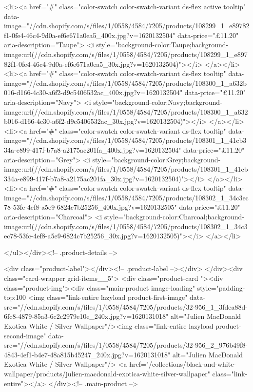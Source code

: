 {{{{{{{<li><a href="#" class="color-swatch color-swatch-variant ds-flex active tooltip" data-image="//cdn.shopify.com/s/files/1/0558/4584/7205/products/108299_1_e89782f1-0fe4-46c4-9d0a-ef6e671a0ea5_400x.jpg?v=1620132504" data-price="£11.20" aria-description="Taupe">
              <i style="background-color:Taupe;background-image:url(//cdn.shopify.com/s/files/1/0558/4584/7205/products/108299_1_e89782f1-0fe4-46c4-9d0a-ef6e671a0ea5_30x.jpg?v=1620132504)"></i>
            </a></li>
<li><a href="#" class="color-swatch color-swatch-variant ds-flex tooltip" data-image="//cdn.shopify.com/s/files/1/0558/4584/7205/products/108300_1_a632b016-d166-4c30-a6f2-d9c5406532ac_400x.jpg?v=1620132504" data-price="£11.20" aria-description="Navy">
              <i style="background-color:Navy;background-image:url(//cdn.shopify.com/s/files/1/0558/4584/7205/products/108300_1_a632b016-d166-4c30-a6f2-d9c5406532ac_30x.jpg?v=1620132504)"></i>
            </a></li>
<li><a href="#" class="color-swatch color-swatch-variant ds-flex tooltip" data-image="//cdn.shopify.com/s/files/1/0558/4584/7205/products/108301_1_41cb334a-e899-417f-b7a8-a2175ac201fa_400x.jpg?v=1620132504" data-price="£11.20" aria-description="Grey">
              <i style="background-color:Grey;background-image:url(//cdn.shopify.com/s/files/1/0558/4584/7205/products/108301_1_41cb334a-e899-417f-b7a8-a2175ac201fa_30x.jpg?v=1620132504)"></i>
            </a></li>
<li><a href="#" class="color-swatch color-swatch-variant ds-flex tooltip" data-image="//cdn.shopify.com/s/files/1/0558/4584/7205/products/108302_1_34c3ec78-53fc-4ef8-a5e9-6824c7b25256_400x.jpg?v=1620132505" data-price="£11.20" aria-description="Charcoal">
              <i style="background-color:Charcoal;background-image:url(//cdn.shopify.com/s/files/1/0558/4584/7205/products/108302_1_34c3ec78-53fc-4ef8-a5e9-6824c7b25256_30x.jpg?v=1620132505)"></i>
            </a></li>

      </ul></div><!-- .product-details -->

<div class="product-label"></div><!-- .product-label --></div>
          </div><div class="card-wrapper grid-items__5">
            <div class="product-card "><div class="product-img"><div class="main-product image-loading" style="padding-top:100%
      <img class="link-entire lazyload product-first-image" data-src="//cdn.shopify.com/s/files/1/0558/4584/7205/products/32-956_1_3fdea88d-6fc8-4879-85a3-6c2c2979e10e_240x.jpg?v=1620131018" alt="Julien MacDonald Exotica White / Silver Wallpaper"/><img class="link-entire lazyload product-second-image" data-src="//cdn.shopify.com/s/files/1/0558/4584/7205/products/32-956_2_976b49f8-4843-4ef1-b4e7-48a815b45247_240x.jpg?v=1620131018" alt="Julien MacDonald Exotica White / Silver Wallpaper"/>
      <a href="/collections/black-and-white-wallpaper/products/julien-macdonald-exotica-white-silver-wallpaper" class="link-entire"></a>
    </div><!-- .main-product -->
  
}}}}}}}
